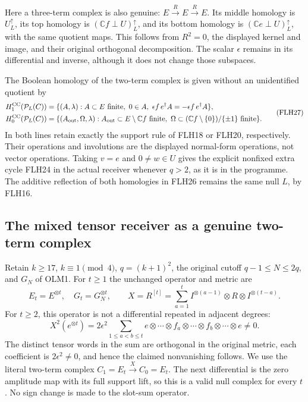 Here a three-term complex is also genuine:
\(E\xrightarrow{R}E\xrightarrow{R}E\).
Its middle homology is \(U_L^\uparrow\), its top homology is
\((\mathbb Cf\perp U)_L^\uparrow\), and its bottom homology is
\((\mathbb Ce\perp U)_L^\uparrow\), with the same quotient maps.
This follows from \(R^2=0\), the displayed kernel and image,
and their original orthogonal decomposition.
The scalar \(\epsilon\) remains in its differential and inverse,
although it does not change those subspaces.

The Boolean homology of the two-term complex is given
without an unidentified quotient by
\[
\begin{aligned}
H_1^{\rm CC}(\mathcal P_L(C))
 &=\{(A,\lambda):A\subset E\text{ finite},\ 0\in A,\
       \epsilon f\,e^\dagger A=-\epsilon f\,e^\dagger A\},\\
H_0^{\rm CC}(\mathcal P_L(C))
 &=\{(A_{\rm out},\Omega,\lambda):
 A_{\rm out}\subset E\setminus\mathbb Cf\text{ finite},\
 \Omega\subset(\mathbb Cf\setminus\{0\})/\{\pm1\}\text{ finite}\}.
\end{aligned}\tag{FLH27}
\]
In both lines retain exactly the support rule of FLH18 or
FLH20, respectively. Their operations and involutions are
the displayed normal-form operations, not vector operations.
Taking \(v=e\) and \(0\ne w\in U\) gives the explicit nonfixed
extra cycle FLH24 in the actual receiver whenever \(q>2\),
as it is in the programme.
The additive reflection of both homologies in FLH26 remains
the same null \(L\), by FLH16.

\subsection{The mixed tensor receiver as a genuine two-term complex}

Retain \(k\ge17\), \(k\equiv1\pmod4\), \(q=(k+1)^2\), the
original cutoff \(q-1\le N\le2q\), and \(G_N\) of OLM1.
For \(t\ge1\) the unchanged operator and metric are
\[
E_t=E^{\otimes t},\quad G_t=G_N^{\otimes t},\qquad
X=R^{[t]}=\sum_{a=1}^t
 I^{\otimes(a-1)}\otimes R\otimes I^{\otimes(t-a)} .
\tag{FLH28}
\]
For \(t\ge2\), this operator is not a differential repeated
in adjacent degrees:
\[
X^2(e^{\otimes t})
=2\epsilon^2\sum_{1\le a<b\le t}
 e\otimes\cdots\otimes f_a\otimes\cdots\otimes f_b
                       \otimes\cdots\otimes e\ne0 .
\tag{FLH29}
\]
The distinct tensor words in the sum are orthogonal in the
original metric, each coefficient is \(2\epsilon^2\ne0\),
and hence the claimed nonvanishing follows. We use the
literal two-term complex \(C_1=E_t\xrightarrow{X}C_0=E_t\).
The next differential is the zero amplitude map with its
full support lift, so this is a valid null complex for every
\(t\). No sign change is made to the slot-sum operator.

